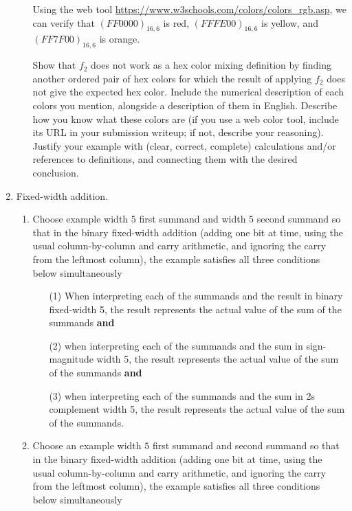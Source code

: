 \begin{enumerate}[labelindent=0pt, leftmargin=0pt]
\begin{enumerate}
Using the web tool \url{https://www.w3schools.com/colors/colors_rgb.asp}, we can verify that $(FF0000)_{16,6}$ is red, 
$(FFFE00)_{16,6}$ is yellow, and $(FF7F00)_{16,6}$ is orange.

Show that $f_2$ does not work as a hex color mixing definition by finding
another ordered pair of hex colors for which the result of applying $f_2$ does not give the expected hex color.
Include the numerical description of each colors you mention, alongside a description of them in English. 
Describe how you know what these colors are
(if you use a web color tool, include its URL in your submission writeup; if not, describe your reasoning).
Justify your 
example with (clear, correct, complete) calculations and/or references to definitions, and connecting them with
the desired conclusion.
\end{enumerate}
        \item Fixed-width addition.  
        \begin{enumerate}
            \item Choose example width $5$ first summand and width $5$ second summand so that 
            in the  binary fixed-width addition (adding one bit at time, using 
            the usual column-by-column and carry arithmetic, and ignoring the carry 
            from the  leftmost column), the example satisfies all three conditions below simultaneously
            \begin{itemize}
            \item[(1)] When interpreting each of the summands and the result in binary fixed-width 5, 
            the result represents the actual value of the sum of the summands {\bf and}
            \item[(2)] when interpreting each of the summands and the sum in sign-magnitude width 5, the result  
            represents the actual value of the sum of the summands {\bf and}
            \item[(3)] when interpreting each of the summands and the sum in 2s complement width 5, the result 
            represents the actual value of the sum of the summands.
            \end{itemize}
            \item Choose an example width $5$ first summand and second summand so that 
            in the binary fixed-width addition (adding one bit at time, using 
            the usual column-by-column and carry arithmetic, and ignoring the carry 
            from the  leftmost column),  the example satisfies all three conditions below simultaneously

\end{enumerate}
\end{enumerate}
